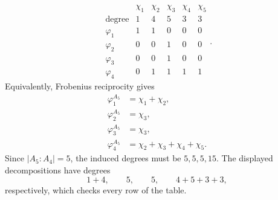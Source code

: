 \documentclass[../Odyssey_Project.tex]{subfiles}
\begin{document}
\begin{solution}
    \[
        \begin{array}{c|ccccc}
            &\chi_1&\chi_2&\chi_3&\chi_4&\chi_5\\
            \text{degree}&1&4&5&3&3\\
            \hline
            \varphi_1&1&1&0&0&0\\
            \varphi_2&0&0&1&0&0\\
            \varphi_3&0&0&1&0&0\\
            \varphi_4&0&1&1&1&1
        \end{array}.
    \]
    Equivalently, Frobenius reciprocity gives
    \[
        \begin{aligned}
            \varphi_1^{A_5}&=\chi_1+\chi_2,\\
            \varphi_2^{A_5}&=\chi_3,\\
            \varphi_3^{A_5}&=\chi_3,\\
            \varphi_4^{A_5}&=\chi_2+\chi_3+\chi_4+\chi_5.
        \end{aligned}
    \]
    Since $|A_5 : A_4|=5$, the induced degrees must be $5,5,5,15$. The displayed decompositions have degrees
    \[
        1+4,
        \qquad
        5,
        \qquad
        5,
        \qquad
        4+5+3+3,
    \]
    respectively, which checks every row of the table.
\end{solution}
\end{document}
